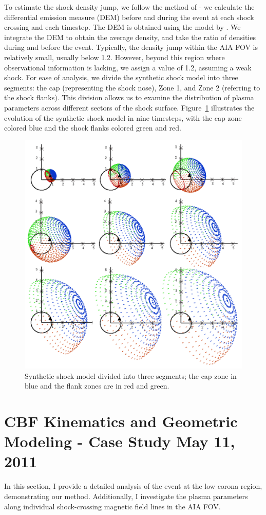To estimate the shock density jump, we follow the method of \citet{kozarev_2017} - we calculate the differential emission measure (DEM) before and during the event at each shock crossing and each timestep. The DEM is obtained using the model by \citet{cheung_2015}. We integrate the DEM to obtain the average density, and take the ratio of densities during and before the event.
Typically, the density jump within the AIA FOV is relatively small, usually below 1.2. However, beyond this region where observational information is lacking, we assign a value of 1.2, assuming a weak shock.
For ease of analysis, we divide the synthetic shock model into three segments: the cap (representing the shock nose), Zone 1, and Zone 2 (referring to the shock flanks). This division allows us to examine the distribution of plasma parameters across different sectors of the shock surface. Figure~\ref{fig_segments} illustrates the evolution of the synthetic shock model in nine timesteps, with the cap zone colored blue and the shock flanks colored green and red.

\begin{figure}[!htp] %
	\centerline{\includegraphics[width=0.7\columnwidth]{chapter2/figs/fig_s2m_segments_geometry.png}}
	\caption{Synthetic shock model divided into three segments; the cap zone in blue and the flank zones are in red and green.}
	\label{fig_segments}
\end{figure}

\section{CBF Kinematics and Geometric Modeling - Case Study May 11, 2011}
In this section, I provide a detailed analysis of the event at the low corona region, demonstrating our method. Additionally, I investigate the plasma parameters along individual shock-crossing magnetic field lines in the AIA FOV.

